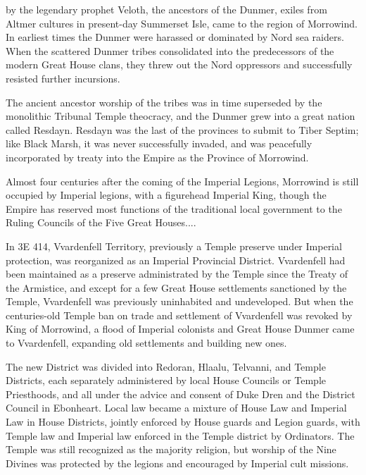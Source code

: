 
 by the legendary prophet Veloth, the ancestors of the Dunmer, exiles from Altmer cultures in present-day Summerset Isle, came to the region of Morrowind. In earliest times the Dunmer were harassed or dominated by Nord sea raiders. When the scattered Dunmer tribes consolidated into the predecessors of the modern Great House clans, they threw out the Nord oppressors and successfully resisted further incursions.

The ancient ancestor worship of the tribes was in time superseded by the monolithic Tribunal Temple theocracy, and the Dunmer grew into a great nation called Resdayn. Resdayn was the last of the provinces to submit to Tiber Septim; like Black Marsh, it was never successfully invaded, and was peacefully incorporated by treaty into the Empire as the Province of Morrowind.

Almost four centuries after the coming of the Imperial Legions, Morrowind is still occupied by Imperial legions, with a figurehead Imperial King, though the Empire has reserved most functions of the traditional local government to the Ruling Councils of the Five Great Houses....

In 3E 414, Vvardenfell Territory, previously a Temple preserve under Imperial protection, was reorganized as an Imperial Provincial District. Vvardenfell had been maintained as a preserve administrated by the Temple since the Treaty of the Armistice, and except for a few Great House settlements sanctioned by the Temple, Vvardenfell was previously uninhabited and undeveloped. But when the centuries-old Temple ban on trade and settlement of Vvardenfell was revoked by King of Morrowind, a flood of Imperial colonists and Great House Dunmer came to Vvardenfell, expanding old settlements and building new ones.

The new District was divided into Redoran, Hlaalu, Telvanni, and Temple Districts, each separately administered by local House Councils or Temple Priesthoods, and all under the advice and consent of Duke Dren and the District Council in Ebonheart. Local law became a mixture of House Law and Imperial Law in House Districts, jointly enforced by House guards and Legion guards, with Temple law and Imperial law enforced in the Temple district by Ordinators. The Temple was still recognized as the majority religion, but worship of the Nine Divines was protected by the legions and encouraged by Imperial cult missions.


